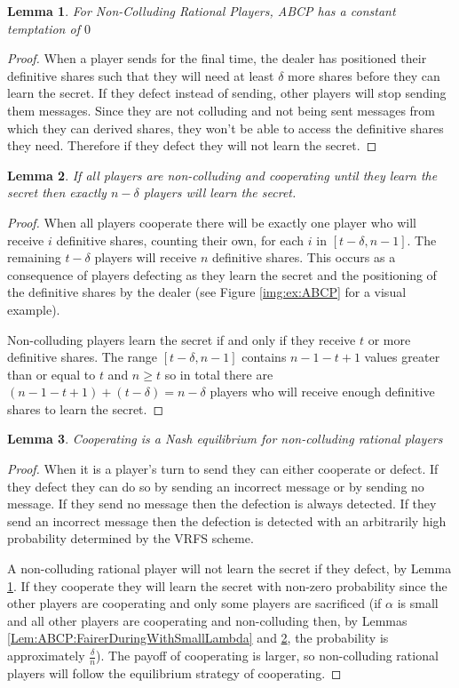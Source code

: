 \documentclass{dalcsthesis}
\newtheorem{lemma}{Lemma}
\begin{document}
\begin{lemma} For Non-Colluding Rational Players, ABCP has a constant temptation of $0$ \label{Lem:ABCP:SoloTemptNone} \end{lemma}
\begin{proof}
When a player sends for the final time, the dealer has positioned their definitive shares such that they will need at least $\delta$ more shares before they can learn the secret. If they defect instead of sending, other players will stop sending them messages. Since they are not colluding and not being sent messages from which they can derived shares, they won't be able to access the definitive shares they need. Therefore if they defect they will not learn the secret.
\end{proof}

\begin{lemma}If all players are non-colluding and cooperating until they learn the secret then exactly $n-\delta$ players will learn the secret. \label{Lem:ABCP:AllDeltaLose}\end{lemma}
\begin{proof}
When all players cooperate there will be exactly one player who will receive $i$ definitive shares, counting their own, for each $i$ in $[t-\delta, n-1]$. The remaining $t-\delta$ players will receive $n$ definitive shares. This occurs as a consequence of players defecting as they learn the secret and the positioning of the definitive shares by the dealer (see Figure \ref{img:ex:ABCP} for a visual example).

Non-colluding players learn the secret if and only if they receive $t$ or more definitive shares. The range $[t-\delta, n-1]$ contains $n-1-t+1$ values greater than or equal to $t$ and $n \geq t$ so in total there are $(n-1-t+1) + (t-\delta) = n-\delta$ players who will receive enough definitive shares to learn the secret.
\end{proof}

\begin{lemma} Cooperating is a Nash equilibrium for non-colluding rational players \end{lemma}
\begin{proof}
When it is a player's turn to send they can either cooperate or defect. If they defect they can do so by sending an incorrect message or by sending no message. If they send no message then the defection is always detected. If they send an incorrect message then the defection is detected with an arbitrarily high probability determined by the VRFS scheme.

A non-colluding rational player will not learn the secret if they defect, by Lemma \ref{Lem:ABCP:SoloTemptNone}. If they cooperate they will learn the secret with non-zero probability  since the other players are cooperating and only some players are sacrificed (if $\alpha$ is small and all other players are cooperating and non-colluding then, by Lemmas \ref{Lem:ABCP:FairerDuringWithSmallLambda} and \ref{Lem:ABCP:AllDeltaLose}, the probability is approximately $\frac{\delta}{n}$). The payoff of cooperating is larger, so non-colluding rational players will follow the equilibrium strategy of cooperating.
\end{proof}
\end{document}
